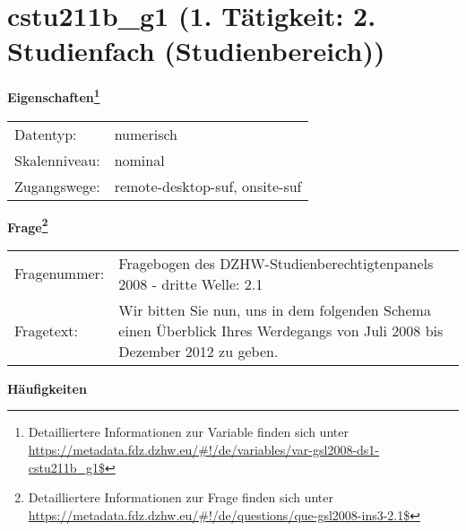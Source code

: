 
    \setcounter{footnote}{0}

    \vspace*{-1.8cm}
	\section{cstu211b\_g1 (1. Tätigkeit: 2. Studienfach (Studienbereich))}
	\label{section:cstu211b_g1}



    \vspace*{0.5cm}
    \noindent\textbf{Eigenschaften\footnote{Detailliertere Informationen zur Variable finden sich unter
		\url{https://metadata.fdz.dzhw.eu/\#!/de/variables/var-gsl2008-ds1-cstu211b_g1$}}}\\
	\begin{tabularx}{\hsize}{@{}lX}
	Datentyp: & numerisch \\
	Skalenniveau: & nominal \\
	Zugangswege: &
	  remote-desktop-suf, 
	  onsite-suf
 \\
    \end{tabularx}



				\vspace*{0.5cm}
                \noindent\textbf{Frage\footnote{Detailliertere Informationen zur Frage finden sich unter
		              \url{https://metadata.fdz.dzhw.eu/\#!/de/questions/que-gsl2008-ins3-2.1$}}}\\
				\begin{tabularx}{\hsize}{@{}lX}
					Fragenummer: &
					  Fragebogen des DZHW-Studienberechtigtenpanels 2008 - dritte Welle:
					  2.1
 \\
					Fragetext: & Wir bitten Sie nun, uns in dem folgenden Schema einen Überblick Ihres Werdegangs von Juli 2008 bis Dezember 2012 zu geben. \\
				\end{tabularx}





        		\vspace*{0.5cm}
                \noindent\textbf{Häufigkeiten}


